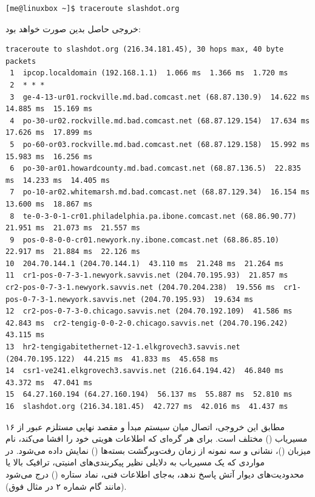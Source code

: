 \begin{latin}
\begin{lstlisting}
[me@linuxbox ~]$ traceroute slashdot.org
\end{lstlisting}
\end{latin}

خروجی حاصل بدین صورت خواهد بود:

\begin{latin}
\begin{lstlisting}
traceroute to slashdot.org (216.34.181.45), 30 hops max, 40 byte packets
 1  ipcop.localdomain (192.168.1.1)  1.066 ms  1.366 ms  1.720 ms
 2  * * *
 3  ge-4-13-ur01.rockville.md.bad.comcast.net (68.87.130.9)  14.622 ms  14.885 ms  15.169 ms
 4  po-30-ur02.rockville.md.bad.comcast.net (68.87.129.154)  17.634 ms  17.626 ms  17.899 ms
 5  po-60-or03.rockville.md.bad.comcast.net (68.87.129.158)  15.992 ms  15.983 ms  16.256 ms
 6  po-30-ar01.howardcounty.md.bad.comcast.net (68.87.136.5)  22.835 ms  14.233 ms  14.405 ms
 7  po-10-ar02.whitemarsh.md.bad.comcast.net (68.87.129.34)  16.154 ms  13.600 ms  18.867 ms
 8  te-0-3-0-1-cr01.philadelphia.pa.ibone.comcast.net (68.86.90.77)  21.951 ms  21.073 ms  21.557 ms
 9  pos-0-8-0-0-cr01.newyork.ny.ibone.comcast.net (68.86.85.10)  22.917 ms  21.884 ms  22.126 ms
10  204.70.144.1 (204.70.144.1)  43.110 ms  21.248 ms  21.264 ms
11  cr1-pos-0-7-3-1.newyork.savvis.net (204.70.195.93)  21.857 ms  cr2-pos-0-7-3-1.newyork.savvis.net (204.70.204.238)  19.556 ms  cr1-pos-0-7-3-1.newyork.savvis.net (204.70.195.93)  19.634 ms
12  cr2-pos-0-7-3-0.chicago.savvis.net (204.70.192.109)  41.586 ms  42.843 ms  cr2-tengig-0-0-2-0.chicago.savvis.net (204.70.196.242)  43.115 ms
13  hr2-tengigabitethernet-12-1.elkgrovech3.savvis.net (204.70.195.122)  44.215 ms  41.833 ms  45.658 ms
14  csr1-ve241.elkgrovech3.savvis.net (216.64.194.42)  46.840 ms  43.372 ms  47.041 ms
15  64.27.160.194 (64.27.160.194)  56.137 ms  55.887 ms  52.810 ms
16  slashdot.org (216.34.181.45)  42.727 ms  42.016 ms  41.437 ms
\end{lstlisting}
\end{latin}

مطابق این خروجی، اتصال میان سیستم مبدأ و مقصد نهایی مستلزم عبور از ۱۶ مسیریاب () مختلف است. برای هر گره‌ای که اطلاعات هویتی خود را افشا می‌کند، نام میزبان ()، نشانی  و سه نمونه از زمان رفت‌وبرگشت بسته‌ها () نمایش داده می‌شود. در مواردی که یک مسیریاب به دلایلی نظیر پیکربندی‌های امنیتی، ترافیک بالا یا محدودیت‌های دیوار آتش پاسخ ندهد، به‌جای اطلاعات فنی، نماد ستاره (\cmd{*}) درج می‌شود (مانند گام شماره ۲ در مثال فوق).

